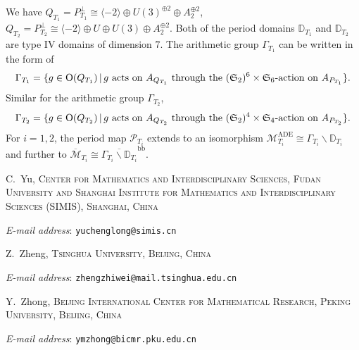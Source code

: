 \documentclass[12pt,reqno,a4paper]{amsart}
\theoremstyle{remark}
\theoremstyle{definition}
\begin{document}
We have $Q_{T_1}=P_{T_1}^\perp\cong \langle -2\rangle\oplus U(3)^{\oplus 2}\oplus A_2^{\oplus 2}$, $Q_{T_2}=P_{T_2}^\perp\cong \langle -2\rangle\oplus U\oplus U(3)\oplus A_2^{\oplus 2}$.
Both of the period domains $\mathbb{D}_{T_1}$ and $\mathbb{D}_{T_2}$ are type IV domains of dimension $7$.
The arithmetic group $\Gamma_{T_1}$ can be written in the form of
\begin{equation*}
    \Gamma_{T_1} = \{ g\in\mathrm{O}(Q_{T_1}) \,|\, g \textup{ acts on } A_{Q_{T_1}} \textup{ through the } (\mathfrak{S}_2)^6\times\mathfrak{S}_6\textup{-action on } A_{P_{T_1}} \}.
\end{equation*}
Similar for the arithmetic group $\Gamma_{T_2}$,
\begin{equation*}
    \Gamma_{T_2} = \{ g\in\mathrm{O}(Q_{T_2}) \,|\, g \textup{ acts on } A_{Q_{T_2}} \textup{ through the } (\mathfrak{S}_2)^4\times\mathfrak{S}_4\textup{-action on } A_{P_{T_2}} \}.
\end{equation*}
For $i=1,2$, the period map $\mathscr{P}_{T_i}$ extends to an isomorphism $\mathcal{M}_{T_i}^{\mathrm{ADE}} \cong \Gamma_{T_i} \backslash \mathbb{D}_{T_i}$ and further to $\overline{\mathcal{M}}_{T_i} \cong \overline{\Gamma_{T_i} \backslash \mathbb{D}_{T_i}}^{\mathrm{bb}}$.





{		\bigskip
		\footnotesize
		
		C.~Yu, \textsc{Center for Mathematics and Interdisciplinary Sciences, Fudan University and
Shanghai Institute for Mathematics and Interdisciplinary Sciences (SIMIS), Shanghai, China}\par\nopagebreak
		\textit{E-mail address}: \texttt{yuchenglong@simis.cn}
		
		\medskip
		
		Z.~Zheng, \textsc{Tsinghua University, Beijing, China}\par\nopagebreak
		\textit{E-mail address}: \texttt{zhengzhiwei@mail.tsinghua.edu.cn}

        \medskip
		
		Y.~Zhong, \textsc{Beijing International Center for Mathematical Research, Peking University, Beijing, China}\par\nopagebreak
		\textit{E-mail address}: \texttt{ymzhong@bicmr.pku.edu.cn}
}
\end{document}
